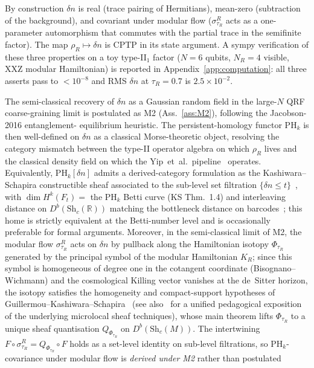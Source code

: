 \documentclass[aps,prd,superscriptaddress,nofootinbib,floatfix,10pt]{revtex4-2}
\theoremstyle{remark}
\newcommand{\tauR}{\tau_{R}}
\newcommand{\PHk}{\mathrm{PH}_{k}}
\newcommand{\dn}{\delta n}
\begin{document}
By construction $\dn$ is real (trace pairing of Hermitians), mean-zero
(subtraction of the background), and covariant under modular flow
($\sigma^{R}_{\tauR}$ acts as a one-parameter automorphism that
commutes with the partial trace in the semifinite factor). The map
$\rho_{R}\mapsto\dn$ is CPTP in its state argument. A sympy
verification of these three properties on a toy type-II$_{1}$ factor
($N=6$ qubits, $N_{R}=4$ visible, XXZ modular Hamiltonian) is reported
in Appendix~\ref{app:computation}: all three asserts pass
to $<10^{-8}$ and RMS $\dn$ at $\tauR=0.7$ is
$2.5\times 10^{-2}$.

The semi-classical recovery of $\dn$ as a Gaussian random field in the
large-$N$ QRF coarse-graining limit is postulated as M2
(Ass.~\ref{ass:M2}), following the Jacobson-2016 entanglement-
equilibrium heuristic. The persistent-homology functor $\PHk$ is then
well-defined on $\dn$ as a classical Morse-theoretic object, resolving
the category mismatch between the type-II operator algebra on which
$\rho_{R}$ lives and the classical density field on which the
Yip~et~al.\ pipeline~\cite{Yip2024} operates. Equivalently,
$\PHk[\dn]$ admits a derived-category formulation as the
Kashiwara--Schapira constructible sheaf associated to the sub-level
set filtration
$\{\dn \le t\}$~\cite{KashiwaraSchapira2018}, with
$\dim H^{k}(F_{t}) = $ the PH$_{k}$ Betti curve (KS Thm.~1.4) and
interleaving distance on $D^{b}(\mathrm{Sh}_{c}(\mathbb{R}))$ matching
the bottleneck distance on
barcodes~\cite{BerkoukGinot2018}; this home is strictly equivalent at
the Betti-number level and is occasionally preferable for formal
arguments. Moreover, in the semi-classical limit of M2, the modular
flow $\sigma^{R}_{\tauR}$ acts on $\dn$ by pullback along the
Hamiltonian isotopy $\Phi_{\tauR}$ generated by the principal symbol
of the modular Hamiltonian $K_{R}$; since this symbol is homogeneous
of degree one in the cotangent coordinate (Bisognano--Wichmann) and
the cosmological Killing vector vanishes at the de~Sitter horizon,
the isotopy satisfies the homogeneity and compact-support hypotheses
of Guillermou--Kashiwara--Schapira~\cite{GuillermouKashiwaraSchapira2012}
(see also~\cite{Guillermou2023Asterisque} for a unified pedagogical
exposition of the underlying microlocal sheaf techniques),
whose main theorem lifts $\Phi_{\tauR}$ to a unique sheaf quantisation
$Q_{\Phi_{\tauR}}$ on $D^{b}(\mathrm{Sh}_{c}(M))$. The intertwining
$F \circ \sigma^{R}_{\tauR} = Q_{\Phi_{\tauR}} \circ F$ holds as a
set-level identity on sub-level filtrations, so PH$_{k}$-covariance
under modular flow is \emph{derived under M2} rather than postulated
\end{document}
